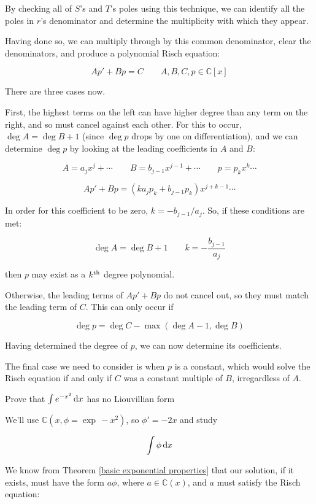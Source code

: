By checking all of $S$'s and $T$'s poles using this technique, we can
identify all the poles in $r$'s denominator and determine the
multiplicity with which they appear.

Having done so, we can multiply through by this common denominator,
clear the denominators, and produce a polynomial Risch equation:

$$A p' + B p = C \qquad A,B,C,p \in {\mathbb C}[x]$$

There are three cases now.

First, the highest terms on the left can have higher degree than any term on
the right, and so must cancel against each other.  For this to occur,
$\deg A = \deg B + 1$ (since $\deg p$ drops by one on differentiation),
and we can determine $\deg p$ by looking at the leading
coefficients in $A$ and $B$:

$$A = a_j x^j + \cdots \qquad B = b_{j-1} x^{j-1} + \cdots \qquad p = p_k x^k \cdots$$

$$A p' + B p = (k a_j p_k + b_{j-1} p_k) x^{j+k-1} \cdots$$

In order for this coefficient to be zero, $k=-b_{j-1}/a_j$.
So, if these conditions are met:

$$\deg A = \deg B + 1 \qquad k=-\frac{b_{j-1}}{a_j} $$

then $p$ may exist as a $k^{\rm th}$ degree polynomial.

Otherwise, the leading terms of $A p' + B p$ do not cancel out,
so they must match the leading term of $C$.  This can only
occur if

$$\deg p = \deg C - \max(\deg A - 1, \deg B)$$

Having determined the degree of $p$, we can now determine its
coefficients.

The final case we need to consider is when $p$ is a constant, which
would solve the Risch equation if and only if $C$ was a constant
multiple of $B$, irregardless of $A$.

\vfill\eject

\example Prove that $\int e^{-x^2}\, {\rm d}x$ has no Liouvillian form

We'll use ${\mathbb C}(x, \phi = \exp\, -x^2)$, so $\phi' = -2x$ and
study

$$\int \phi \, {\rm d}x$$

We know from Theorem \ref{basic exponential properties} that our
solution, if it exists, must have the form $a\phi$, where $a \in
{\mathbb C}(x)$, and $a$ must satisfy the Risch equation:

